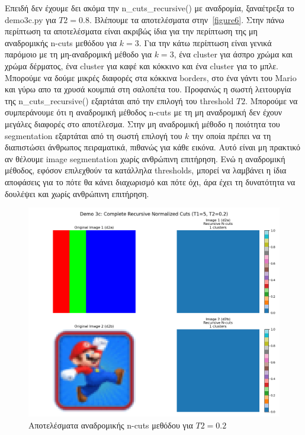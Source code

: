 \documentclass{article}
\begin{document}
Επειδή δεν έχουμε δει ακόμα την n\_cuts\_recursive() με αναδρομία, ξαναέτρεξα το
demo3c.py για $T2=0.8$. Βλέπουμε τα αποτελέσματα στην~\autoref{figure6}. Στην 
πάνω περίπτωση τα αποτελέσματα είναι ακριβώς ίδια για την περίπτωση της 
μη αναδρομικής n-cuts μεθόδου για $k=3$. Για την κάτω περίπτωση είναι 
γενικά παρόμοιο με τη μη-αναδρομική μέθοδο για $k=3$, 
ένα cluster για άσπρο χρώμα και χρώμα δέρματος, ένα cluster 
για καφέ και κόκκινο και ένα cluster για το μπλε. Μπορούμε να
δούμε μικρές διαφορές στα κόκκινα borders, στο ένα γάντι του Mario
και γύρω απο τα χρυσά κουμπιά στη σαλοπέτα του. Προφανώς η σωστή 
λειτουργία της n\_cuts\_recursive() εξαρτάται από την επιλογή 
του threshold $T2$. Μπορούμε να συμπεράνουμε ότι η αναδρομική 
μέθοδος n-cuts με τη μη αναδρομική δεν έχουν μεγάλες διαφορές 
στο αποτέλεσμα. Στην μη αναδρομική μέθοδο η ποιότητα του segmentation
εξαρτάται από τη σωστή επιλογή του $k$ την οποία πρέπει να τη 
διαπιστώσει άνθρωπος πειραματικά, πιθανώς για κάθε εικόνα. Αυτό είναι
μη πρακτικό αν θέλουμε image segmentation χωρίς ανθρώπινη επιτήρηση. 
Ενώ η αναδρομική μέθοδος, εφόσον επιλεχθούν τα κατάλληλα thresholds, 
μπορεί να λαμβάνει η ίδια αποφάσεις για το πότε θα κάνει 
διαχωρισμό και πότε όχι, άρα έχει τη δυνατότητα να δουλέψει και
χωρίς ανθρώπινη επιτήρηση.

\begin{figure}
    \centering
    \includegraphics[width=\linewidth]{Figure_5.png}
    \caption{Αποτελέσματα αναδρομικής n-cuts μεθόδου για $T2=0.2$}\label{figure5}
\end{figure}
\end{document}
